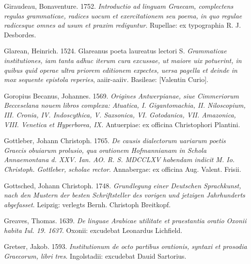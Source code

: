 \begin{styleStandard}
Giraudeau, Bonaventure. 1752. \textit{Introductio ad linguam Graecam, complectens regulas grammaticae, radices uocum et exercitationem seu poema, in quo regulae radicesque omnes ad usum et praxim rediguntur}. Rupellae: ex typographia R. J. Desbordes.
\end{styleStandard}

\begin{styleStandard}
Glarean, Heinrich. 1524. Glareanus poeta laureatus lectori S. \textit{Grammaticae institutiones, iam tanta adhuc iterum cura excussae, ut maiore uix potuerint, in quibus quid operae ultra priorem editionem expectes, uersa pagella et deinde in mox sequente epistola reperies}, aaiir-aaiiv. Basileae: [Valentin Curio].
\end{styleStandard}

\begin{styleStandard}
Goropius Becanus, Johannes. 1569. \textit{Origines Antwerpianae, siue Cimmeriorum Becceselana nouem libros complexa: Atuatica, I. Gigantomachia, II. Niloscopium, III. Cronia, IV. Indoscythica, V. Saxsonica, VI. Gotodanica, VII. Amazonica, VIII. Venetica et Hyperborea, IX.} Antuerpiae: ex officina Christophori Plantini.
\end{styleStandard}

\begin{styleStandard}
Gottleber, Johann Christoph. 1765. \textit{De causis dialectorum uariarum poetis Graecis obuiarum prolusio, qua orationem Hofmannianam in Schola Annaemontana d. XXV. Ian. AO. R. S. MDCCLXV habendam indicit M. Io. Christoph. Gottleber, scholae rector}. Annabergae: ex officina Aug. Valent. Frisii.
\end{styleStandard}

\begin{styleStandard}
Gottsched, Johann Christoph. 1748. \textit{Grundlegung einer Deutschen Sprachkunst, nach den Mustern der besten Schriftsteller des vorigen und jetzigen Jahrhunderts abgefasset}. Leipzig: verlegts Bernh. Christoph Breitkopf.
\end{styleStandard}

\begin{styleStandard}
Greaves, Thomas. 1639. \textit{De linguae Arabicae utilitate et praestantia oratio Oxonii habita Iul. 19. 1637}. Oxonii: excudebat Leonardus Lichfield.
\end{styleStandard}

\begin{styleStandard}
Gretser, Jakob. 1593. \textit{Institutionum de octo partibus orationis, syntaxi et prosodia Graecorum, libri tres}. Ingolstadii: excudebat Dauid Sartorius.
\end{styleStandard}

